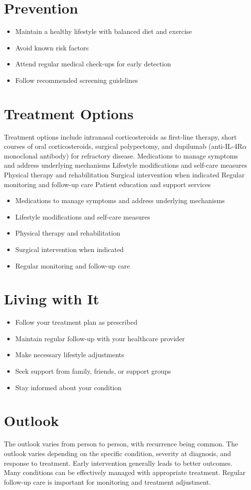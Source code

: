 \section{Prevention}
\begin{itemize}[noitemsep]
  \item Maintain a healthy lifestyle with balanced diet and exercise
  \item Avoid known risk factors
  \item Attend regular medical check-ups for early detection
  \item Follow recommended screening guidelines
\end{itemize}
\section{Treatment Options}
Treatment options include intranasal corticosteroids as first-line therapy, short courses of oral corticosteroids, surgical polypectomy, and dupilumab (anti-IL-4R$\alpha$ monoclonal antibody) for refractory disease. Medications to manage symptoms and address underlying mechanisms Lifestyle modifications and self-care measures Physical therapy and rehabilitation Surgical intervention when indicated Regular monitoring and follow-up care Patient education and support services

\begin{itemize}[noitemsep]
  \item Medications to manage symptoms and address underlying mechanisms
  \item Lifestyle modifications and self-care measures
  \item Physical therapy and rehabilitation
  \item Surgical intervention when indicated
  \item Regular monitoring and follow-up care
\end{itemize}
\section{Living with It}
\begin{itemize}[noitemsep]
  \item Follow your treatment plan as prescribed
  \item Maintain regular follow-up with your healthcare provider
  \item Make necessary lifestyle adjustments
  \item Seek support from family, friends, or support groups
  \item Stay informed about your condition
\end{itemize}
\section{Outlook}
The outlook varies from person to person, with recurrence being common. The outlook varies depending on the specific condition, severity at diagnosis, and response to treatment. Early intervention generally leads to better outcomes. Many conditions can be effectively managed with appropriate treatment. Regular follow-up care is important for monitoring and treatment adjustment.
